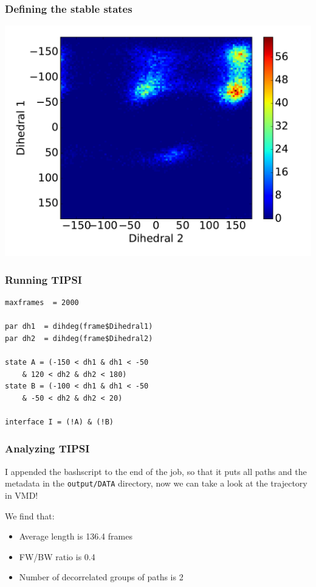 \documentclass[hyperref={pdfpagelabels=false}]{beamer}
\begin{document}
\begin{frame}
\frametitle{Defining the stable states} 
\begin{center}
\includegraphics[scale=0.4]{images/C_2D.pdf}
\end{center}
\end{frame}

\begin{frame}[fragile]
\frametitle{Running \textsc{TIPSI}}
\begin{lstlisting}
maxframes  = 2000

par dh1  = dihdeg(frame$Dihedral1)
par dh2  = dihdeg(frame$Dihedral2)

state A = (-150 < dh1 & dh1 < -50 
	& 120 < dh2 & dh2 < 180)
state B = (-100 < dh1 & dh1 < -50 
	& -50 < dh2 & dh2 < 20)

interface I = (!A) & (!B)
\end{lstlisting}
\end{frame}

\begin{frame}
\frametitle{Analyzing \textsc{TIPSI}} 

I appended the bashscript to the end of the job, so that it puts all paths and the metadata in the \texttt{output/DATA} directory, now we can take a look at the trajectory in VMD! 

We find that:

\begin{itemize}
\item Average length is 136.4 frames
\item FW/BW ratio is 0.4
\item Number of decorrelated groups of paths is 2
\end{itemize}

\end{frame}
\end{document}
